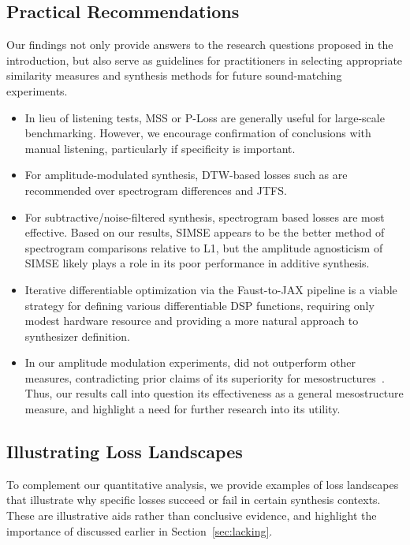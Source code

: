 \subsection{Practical Recommendations}
    Our findings not only provide answers to the research questions proposed in the introduction, but also serve as guidelines for practitioners in selecting appropriate similarity measures and synthesis methods for future sound-matching experiments.
\begin{itemize}
    \item In lieu of listening tests, MSS or P-Loss are generally useful for large-scale benchmarking. However, we encourage confirmation of conclusions with manual listening, particularly if specificity is important. 
    \item For amplitude-modulated synthesis, DTW-based losses such as \DTWEnv{} are recommended over spectrogram differences and JTFS.
    \item  For subtractive/noise-filtered synthesis, spectrogram based losses are most effective. Based on our results, SIMSE appears to be the better method of spectrogram comparisons relative to L1, but the amplitude agnosticism of SIMSE likely plays a role in its poor performance in additive synthesis.  
    \item Iterative differentiable optimization via the Faust-to-JAX pipeline is a viable strategy for defining various differentiable DSP functions, requiring only modest hardware resource and providing a more natural approach to synthesizer definition.
    \item In our amplitude modulation experiments, \JTFS{} did not outperform other measures, contradicting prior claims of its superiority for mesostructures~\cite{vahidi2023mesostructures}. Thus, our results call into question its effectiveness as a general mesostructure measure, and highlight a need for further research into its utility.
\end{itemize}

\subsection{Illustrating Loss Landscapes}
\label{sec:loss_landscape_examples}
To complement our quantitative analysis, we provide examples of loss landscapes that illustrate why specific losses succeed or fail in certain synthesis contexts. These are illustrative aids rather than conclusive evidence, and highlight the importance of \PeriodicLoss{} discussed earlier in Section~\ref{sec:lacking}.

